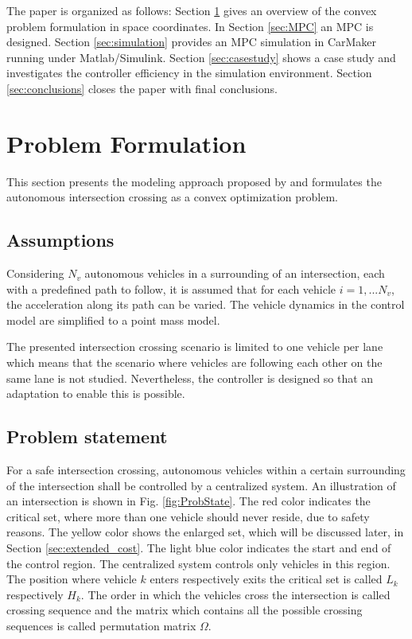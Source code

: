 \documentclass[letterpaper,10pt,conference]{ieeeconf}
\begin{document}
The paper is organized as follows: Section \ref{sec:problem_formulation} gives an overview of the convex problem formulation in space coordinates. In Section \ref{sec:MPC} an MPC is designed. Section \ref{sec:simulation} provides an MPC simulation in CarMaker running under Matlab/Simulink. Section \ref{sec:casestudy} shows a case study and investigates the controller efficiency in the simulation environment. Section \ref{sec:conclusions} closes the paper with final conclusions.

\section{Problem Formulation} \label{sec:problem_formulation}
This section presents the modeling approach proposed by \cite{nikolce} and formulates the autonomous intersection crossing as a convex optimization problem.

\subsection{Assumptions}
Considering $N_v$ autonomous vehicles in a surrounding of an intersection, each with a predefined path to follow, it is assumed that for each vehicle $i=1,...N_v$, the acceleration along its path can be varied. The vehicle dynamics in the control model are simplified to a point mass model.

The presented intersection crossing scenario is limited to one vehicle per lane which means that the scenario where vehicles are following each other on the same lane is not studied. Nevertheless, the controller is designed so that an adaptation to enable this is possible.

\subsection{Problem statement}
For a safe intersection crossing, autonomous vehicles within a certain surrounding of the intersection shall be controlled by a centralized system.
An illustration of an intersection is shown in Fig. \ref{fig:ProbState}. The red color indicates the critical set, where more than one vehicle should never reside, due to safety reasons. The yellow color shows the enlarged set, which will be discussed later, in Section \ref{sec:extended_cost}. The light blue color indicates the start and end of the control region. The centralized system controls only vehicles in this region. The position where vehicle $k$ enters respectively exits the critical set is called $L_k$ respectively $H_k$. The order in which the vehicles cross the intersection is called crossing sequence and the matrix which contains all the possible crossing sequences is called permutation matrix  $\Omega$.
\end{document}
